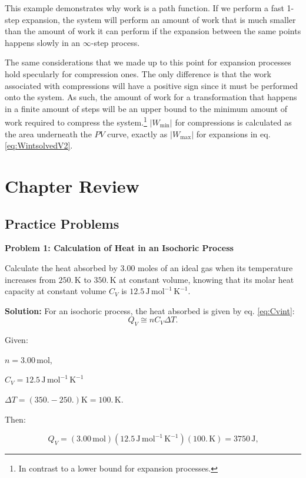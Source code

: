 \documentclass[
  9pt,
]{extbook}
\theoremstyle{definition}
\theoremstyle{definition}
\theoremstyle{definition}
\theoremstyle{definition}
\theoremstyle{remark}
\begin{document}
This example demonstrates why work is a path function. If we perform a fast 1-step expansion, the system will perform an amount of work that is much smaller than the amount of work it can perform if the expansion between the same points happens slowly in an \(\infty\)-step process.

The same considerations that we made up to this point for expansion processes hold specularly for compression ones. The only difference is that the work associated with compressions will have a positive sign since it must be performed onto the system. As such, the amount of work for a transformation that happens in a finite amount of steps will be an upper bound to the minimum amount of work required to compress the system.\footnote{In contrast to a lower bound for expansion processes.} \(\left| W_{\text{min}} \right|\) for compressions is calculated as the area underneath the \(PV\) curve, exactly as \(\left| W_{\text{max}} \right|\) for expansions in eq. \eqref{eq:WintsolvedV2}.

\section{Chapter Review}\label{rev2}

\subsection{Practice Problems}\label{exer2}

\textbf{Problem 1: Calculation of Heat in an Isochoric Process}

Calculate the heat absorbed by 3.00 moles of an ideal gas when its temperature increases from \(250.\, \text{K}\) to \(350.\, \text{K}\) at constant volume, knowing that its molar heat capacity at constant volume \(C_V\) is \(12.5 \, \text{J} \, \text{mol}^{-1} \, \text{K}^{-1}\).

\textbf{Solution:} For an isochoric process, the heat absorbed is given by eq. \eqref{eq:Cvint}: \[  Q_V \cong n C_V \Delta T.\]

Given:

\(n=3.00 \, \text{mol}\),

\(C_V=12.5 \, \text{J} \, \text{mol}^{-1} \, \text{K}^{-1}\)

\(\Delta T = (350.-250.) \text{K}=100.\, \text{K}\).

Then:

\[Q_V=(3.00 \, \text{mol})(12.5\,\text{J} \, \text{mol}^{-1} \, \text{K}^{-1})(100.\,\text{K})=3750\,\text{J,}\]
\end{document}
